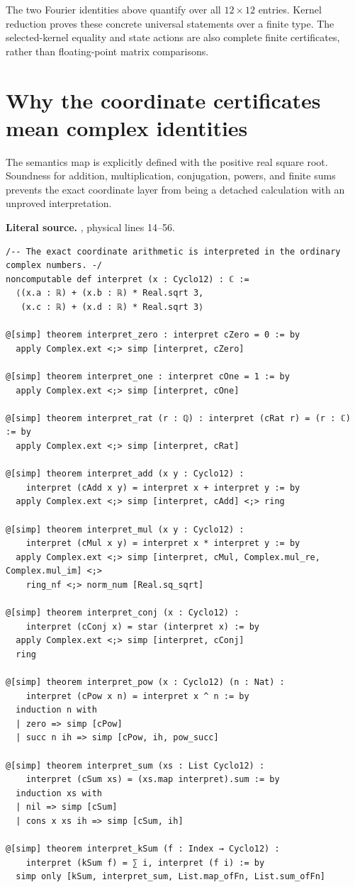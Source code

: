 The two Fourier identities above quantify over all \(12\times12\) entries.
Kernel reduction proves these concrete universal statements over a finite type.
The selected-kernel equality and state actions are also complete finite
certificates, rather than floating-point matrix comparisons.

\section{Why the coordinate certificates mean complex identities}
The semantics map is explicitly defined with the positive real square root.
Soundness for addition, multiplication, conjugation, powers, and finite sums
prevents the exact coordinate layer from being a detached calculation with an
unproved interpretation.

\noindent\textbf{Literal source.} \texttt{}, physical lines 14--56.

\begin{Verbatim}[breaklines=true,breakanywhere=true,fontsize=\footnotesize]
/-- The exact coordinate arithmetic is interpreted in the ordinary complex numbers. -/
noncomputable def interpret (x : Cyclo12) : ℂ :=
  ⟨(x.a : ℝ) + (x.b : ℝ) * Real.sqrt 3,
   (x.c : ℝ) + (x.d : ℝ) * Real.sqrt 3⟩

@[simp] theorem interpret_zero : interpret cZero = 0 := by
  apply Complex.ext <;> simp [interpret, cZero]

@[simp] theorem interpret_one : interpret cOne = 1 := by
  apply Complex.ext <;> simp [interpret, cOne]

@[simp] theorem interpret_rat (r : ℚ) : interpret (cRat r) = (r : ℂ) := by
  apply Complex.ext <;> simp [interpret, cRat]

@[simp] theorem interpret_add (x y : Cyclo12) :
    interpret (cAdd x y) = interpret x + interpret y := by
  apply Complex.ext <;> simp [interpret, cAdd] <;> ring

@[simp] theorem interpret_mul (x y : Cyclo12) :
    interpret (cMul x y) = interpret x * interpret y := by
  apply Complex.ext <;> simp [interpret, cMul, Complex.mul_re, Complex.mul_im] <;>
    ring_nf <;> norm_num [Real.sq_sqrt]

@[simp] theorem interpret_conj (x : Cyclo12) :
    interpret (cConj x) = star (interpret x) := by
  apply Complex.ext <;> simp [interpret, cConj]
  ring

@[simp] theorem interpret_pow (x : Cyclo12) (n : Nat) :
    interpret (cPow x n) = interpret x ^ n := by
  induction n with
  | zero => simp [cPow]
  | succ n ih => simp [cPow, ih, pow_succ]

@[simp] theorem interpret_sum (xs : List Cyclo12) :
    interpret (cSum xs) = (xs.map interpret).sum := by
  induction xs with
  | nil => simp [cSum]
  | cons x xs ih => simp [cSum, ih]

@[simp] theorem interpret_kSum (f : Index → Cyclo12) :
    interpret (kSum f) = ∑ i, interpret (f i) := by
  simp only [kSum, interpret_sum, List.map_ofFn, List.sum_ofFn]
\end{Verbatim}

